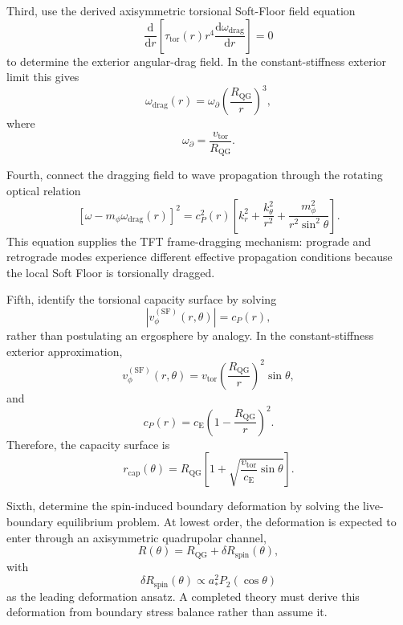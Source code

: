 Third, use the derived axisymmetric torsional Soft-Floor field equation
\begin{equation}
    \frac{\mathrm{d}}{\mathrm{d}r} \left[ \tau_{\mathrm{tor}}(r) r^4 \frac{\mathrm{d}\omega_{\mathrm{drag}}}{\mathrm{d}r} \right] = 0
\end{equation}
to determine the exterior angular-drag field. In the constant-stiffness exterior limit this gives
\begin{equation}
    \omega_{\mathrm{drag}}(r) = \omega_{\partial} \left( \frac{R_{\mathrm{QG}}}{r} \right)^3,
\end{equation}
where
\begin{equation}
    \omega_{\partial} = \frac{v_{\mathrm{tor}}}{R_{\mathrm{QG}}}.
\end{equation}

Fourth, connect the dragging field to wave propagation through the rotating optical relation
\begin{equation}
    \left[ \omega - m_{\phi}\omega_{\mathrm{drag}}(r) \right]^2 = c_P^2(r) \left[ k_r^2 + \frac{k_{\theta}^2}{r^2} + \frac{m_{\phi}^2}{r^2\sin^2\theta} \right].
\end{equation}
This equation supplies the TFT frame-dragging mechanism: prograde and retrograde modes experience different effective propagation conditions because the local Soft Floor is torsionally dragged.

Fifth, identify the torsional capacity surface by solving
\begin{equation}
    \left| v_{\phi}^{(\mathrm{SF})}(r,\theta) \right| = c_P(r),
\end{equation}
rather than postulating an ergosphere by analogy. In the constant-stiffness exterior approximation,
\begin{equation}
    v_{\phi}^{(\mathrm{SF})}(r,\theta) = v_{\mathrm{tor}} \left( \frac{R_{\mathrm{QG}}}{r} \right)^2 \sin\theta,
\end{equation}
and
\begin{equation}
    c_P(r) = c_{\mathrm{E}} \left( 1 - \frac{R_{\mathrm{QG}}}{r} \right)^2.
\end{equation}
Therefore, the capacity surface is
\begin{equation}
    r_{\mathrm{cap}}(\theta) = R_{\mathrm{QG}} \left[ 1 + \sqrt{ \frac{v_{\mathrm{tor}}}{c_{\mathrm{E}}} \sin\theta } \right].
\end{equation}

Sixth, determine the spin-induced boundary deformation by solving the live-boundary equilibrium problem. At lowest order, the deformation is expected to enter through an axisymmetric quadrupolar channel,
\begin{equation}
    R(\theta) = R_{\mathrm{QG}} + \delta R_{\mathrm{spin}}(\theta),
\end{equation}
with
\begin{equation}
    \delta R_{\mathrm{spin}}(\theta) \propto a_\ast^2 P_2(\cos\theta)
\end{equation}
as the leading deformation ansatz. A completed theory must derive this deformation from boundary stress balance rather than assume it.

